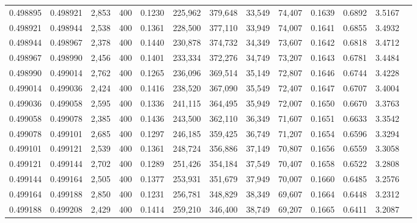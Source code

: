 \begin{tabular}{rrrrrrrrrrrrr}
0.498895 & 0.498921 & 2,853 & 400 &                                     0.1230 & 225,962 & 379,648 &  33,549 &  74,407 & 0.1639 & 0.6892 & 3.5167 \\
0.498921 & 0.498944 & 2,538 & 400 &                                     0.1361 & 228,500 & 377,110 &  33,949 &  74,007 & 0.1641 & 0.6855 & 3.4932 \\
0.498944 & 0.498967 & 2,378 & 400 &                                     0.1440 & 230,878 & 374,732 &  34,349 &  73,607 & 0.1642 & 0.6818 & 3.4712 \\
0.498967 & 0.498990 & 2,456 & 400 &                                     0.1401 & 233,334 & 372,276 &  34,749 &  73,207 & 0.1643 & 0.6781 & 3.4484 \\
0.498990 & 0.499014 & 2,762 & 400 &                                     0.1265 & 236,096 & 369,514 &  35,149 &  72,807 & 0.1646 & 0.6744 & 3.4228 \\
0.499014 & 0.499036 & 2,424 & 400 &                                     0.1416 & 238,520 & 367,090 &  35,549 &  72,407 & 0.1647 & 0.6707 & 3.4004 \\
0.499036 & 0.499058 & 2,595 & 400 &                                     0.1336 & 241,115 & 364,495 &  35,949 &  72,007 & 0.1650 & 0.6670 & 3.3763 \\
0.499058 & 0.499078 & 2,385 & 400 &                                     0.1436 & 243,500 & 362,110 &  36,349 &  71,607 & 0.1651 & 0.6633 & 3.3542 \\
0.499078 & 0.499101 & 2,685 & 400 &                                     0.1297 & 246,185 & 359,425 &  36,749 &  71,207 & 0.1654 & 0.6596 & 3.3294 \\
0.499101 & 0.499121 & 2,539 & 400 &                                     0.1361 & 248,724 & 356,886 &  37,149 &  70,807 & 0.1656 & 0.6559 & 3.3058 \\
0.499121 & 0.499144 & 2,702 & 400 &                                     0.1289 & 251,426 & 354,184 &  37,549 &  70,407 & 0.1658 & 0.6522 & 3.2808 \\
0.499144 & 0.499164 & 2,505 & 400 &                                     0.1377 & 253,931 & 351,679 &  37,949 &  70,007 & 0.1660 & 0.6485 & 3.2576 \\
0.499164 & 0.499188 & 2,850 & 400 &                                     0.1231 & 256,781 & 348,829 &  38,349 &  69,607 & 0.1664 & 0.6448 & 3.2312 \\
0.499188 & 0.499208 & 2,429 & 400 &                                     0.1414 & 259,210 & 346,400 &  38,749 &  69,207 & 0.1665 & 0.6411 & 3.2087 \\

\end{tabular}
